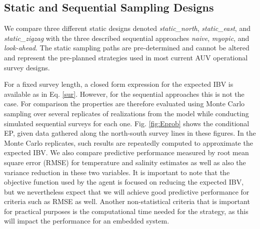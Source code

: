 \documentclass[aoas]{imsart}
\begin{document}
\subsection{Static and Sequential Sampling Designs}\label{sec:sampling_designs}


We compare three different static designs denoted
\textit{static\_north}, \textit{static\_east}, and
\textit{static\_zigzag} with the three described sequential approaches
\textit{naive}, \textit{myopic}, and \textit{look-ahead}. The static sampling paths are pre-determined and cannot be altered and represent the pre-planned strategies used in most current AUV
operational survey designs.

For a fixed survey length, a closed form expression for the expected IBV is available as in Eq. \eqref{sur}. However, for the sequential approaches this is not the
case. For comparison the properties are therefore evaluated using
Monte Carlo sampling over several replicates of realizations from the model while conducting simulated sequential surveys for each
one. Fig. \ref{fig:Eprob} shows the conditional EP, given data
gathered along the north-south survey lines in these figures. In the
Monte Carlo replicates, such results are repeatedly computed to
approximate the expected IBV. We also compare predictive performance
measured by root mean square error (RMSE) for temperature and salinity
estimates as well as also the variance reduction in these two variables. It is
important to note that the objective function used by the agent is
focused on reducing the expected IBV, but we nevertheless expect that
we will achieve good predictive performance for criteria such as RMSE
as well. Another non-statistical criteria that is important for
practical purposes is the computational time needed for the strategy,
as this will impact the performance for an embedded system.

\end{document}
